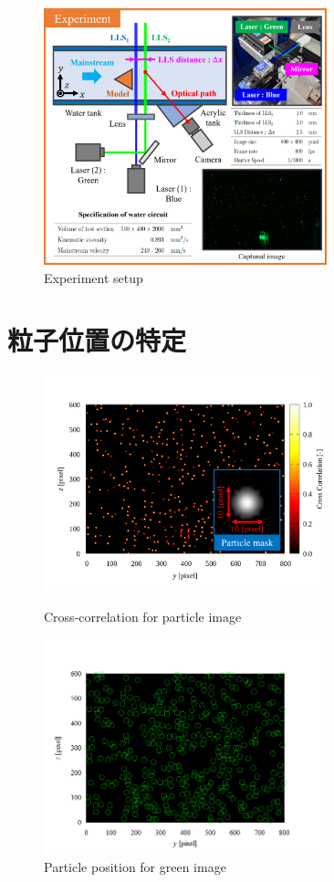 \documentclass[twocolumn,a4j]{jsarticle}
\begin{document}
\begin{figure}[htbp]
	\centering
	\includegraphics[keepaspectratio, width=82mm]{../images/experiment.png}
	\caption{Experiment setup}
\end{figure}

\section{粒子位置の特定}

\begin{figure}[htbp]
	\centering
	\includegraphics[keepaspectratio, width=82mm]{../images/closs-correlation_for_particle.png}
	\caption{Cross-correlation for particle image}
	\includegraphics[keepaspectratio, width=82mm]{../images/particle_position.png}
	\caption{Particle position for green image}
\end{figure}
\end{document}
